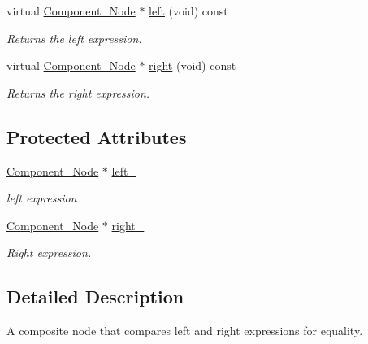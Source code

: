 \begin{DoxyCompactItemize}
virtual \hyperlink{classMadara_1_1Expression__Tree_1_1Component__Node}{Component\_\-Node} $\ast$ \hyperlink{classMadara_1_1Expression__Tree_1_1Composite__Binary__Node_a6ca5cccbc46ccc6026c18f9665298380}{left} (void) const 
\begin{DoxyCompactList}\small\item\em Returns the left expression. \item\end{DoxyCompactList}\item 
virtual \hyperlink{classMadara_1_1Expression__Tree_1_1Component__Node}{Component\_\-Node} $\ast$ \hyperlink{classMadara_1_1Expression__Tree_1_1Composite__Unary__Node_ade55cde5707e0fa73ab1c019159b9aec}{right} (void) const 
\begin{DoxyCompactList}\small\item\em Returns the right expression. \item\end{DoxyCompactList}\end{DoxyCompactItemize}
\subsection*{Protected Attributes}
\begin{DoxyCompactItemize}
\item 
\hyperlink{classMadara_1_1Expression__Tree_1_1Component__Node}{Component\_\-Node} $\ast$ \hyperlink{classMadara_1_1Expression__Tree_1_1Composite__Binary__Node_acac60a70beb2484737e6e7161edb2d1b}{left\_\-}
\begin{DoxyCompactList}\small\item\em left expression \item\end{DoxyCompactList}\item 
\hyperlink{classMadara_1_1Expression__Tree_1_1Component__Node}{Component\_\-Node} $\ast$ \hyperlink{classMadara_1_1Expression__Tree_1_1Composite__Unary__Node_a077b7bd1b52df6f5c6adfde735556a68}{right\_\-}
\begin{DoxyCompactList}\small\item\em Right expression. \item\end{DoxyCompactList}\end{DoxyCompactItemize}


\subsection{Detailed Description}
A composite node that compares left and right expressions for equality. 

